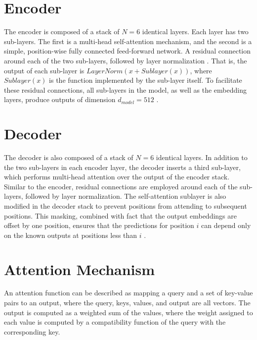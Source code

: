 \section*{Encoder}
\label{sec:encdr}

\hspace{0.5cm} The encoder is composed of a stack of $N = 6$ identical layers. Each layer has two sub-layers. The first is a multi-head self-attention mechanism, and the second is a simple, position-wise fully connected feed-forward network. A residual connection \cite{2016arXiv160202410J} around each of the two sub-layers, followed by layer normalization \cite{2016arXiv160706450L}. That is, the output of each sub-layer is $LayerNorm(x + Sublayer(x))$, where $Sublayer(x)$ is the function implemented by the sub-layer itself. To facilitate these residual connections, all sub-layers in the model, as well as the embedding layers, produce outputs of dimension $d_{model} = 512$ \cite{2017arXiv170603762V}.

\section*{Decoder}
\label{sec:decdr}

\hspace{0.5cm} The decoder is also composed of a stack of $N = 6$ identical layers. In addition to the two sub-layers in each encoder layer, the decoder inserts a third sub-layer, which performs multi-head attention over the output of the encoder stack. Similar to the encoder, residual connections are employed around each of the sub-layers, followed by layer normalization. The self-attention sublayer is also modified in the decoder stack to prevent positions from attending to subsequent positions. This masking, combined with fact that the output embeddings are offset by one position, ensures that the predictions for position $i$ can depend only on the known outputs at positions less than $i$ \cite{2017arXiv170603762V}.

\section*{Attention Mechanism}
\label{sec:attnmec}

\hspace{0.5cm} An attention function can be described as mapping a query and a set of key-value pairs to an output, where the query, keys, values, and output are all vectors. The output is computed as a weighted sum of the values, where the weight assigned to each value is computed by a compatibility function of the query with the corresponding key.


